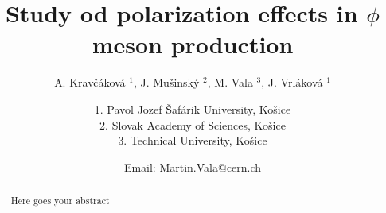 \documentclass[ALICE,manyauthors]{ALICE_analysis_notes}
\def\ll{l\kern-0.6mm\char 39\kern-0.3mm}
\begin{document}
%
%
%
\begin{titlepage}
%
\PHdate{\today}
%
\title{Study od polarization effects in $\phi$ meson production}
%
\author{A. Krav\v c\'akov\'a $^{1}$, J. Mu\v sinsk\'y $^{2}$, M. Va\ll a $^{3}$, J. Vrl\'akov\'a $^{1}$}
\author{
1. Pavol Jozef  \v Saf\'arik University, Ko\v sice\\
2. Slovak Academy of Sciences, Ko\v sice \\
3. Technical University,   Ko\v sice\\
}
\author{Email: Martin.Vala@cern.ch}
%
%
\begin{abstract}
Here goes your abstract
\end{abstract}
\end{titlepage}
%
\end{document}
